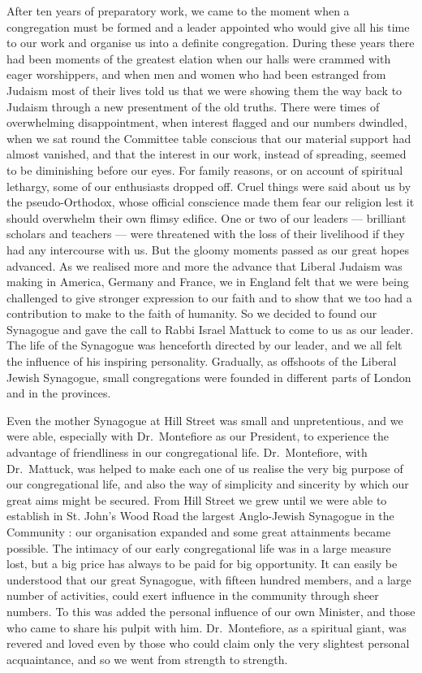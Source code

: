 After ten years of preparatory work, we came to the
moment when a congregation must be formed and a
leader appointed who would give all his time to our
work and organise us into a definite congregation.
During these years there had been moments of the
greatest elation when our halls were crammed with eager
worshippers, and when men and women who had been
estranged from Judaism most of their lives told us that
we were showing them the way back to Judaism through
a new presentment of the old truths. There were times
of overwhelming disappointment, when interest flagged
and our numbers dwindled, when we sat round the
Committee table conscious that our material support had
almost vanished, and that the interest in our work,
instead of spreading, seemed to be diminishing before
our eyes. For family reasons, or on account of spiritual
lethargy, some of our enthusiasts dropped off. Cruel
things were said about us by the pseudo-Orthodox, whose
official conscience made them fear our religion lest it
should overwhelm their own flimsy edifice. One or two
of our leaders — brilliant scholars and teachers — were
threatened with the loss of their livelihood if they had
any intercourse with us. But the gloomy moments
passed as our great hopes advanced. As we realised more
and more the advance that Liberal Judaism was making
in America, Germany and France, we in England felt
that we were being challenged to give stronger expression
to our faith and to show that we too had a contribution
to make to the faith of humanity. So we decided to found
our Synagogue and gave the call to Rabbi Israel Mattuck
to come to us as our leader. The life of the Synagogue
was henceforth directed by our leader, and we all felt
the influence of his inspiring personality. Gradually, as
offshoots of the Liberal Jewish Synagogue, small congregations
were founded in different parts of London and in
the provinces.

Even the mother Synagogue at Hill Street was small
and unpretentious, and we were able, especially with
Dr.\ Montefiore as our President, to experience the
advantage of friendliness in our congregational life.
Dr.\ Montefiore, with Dr.\ Mattuck, was helped to
make each one of us realise the very big purpose of our
congregational life, and also the way of simplicity and
sincerity by which our great aims might be secured.
From Hill Street we grew until we were able to establish
in St. John’s Wood Road the largest Anglo-Jewish
Synagogue in the Community : our organisation expanded
and some great attainments became possible. The
intimacy of our early congregational life was in a large
measure lost, but a big price has always to be paid for
big opportunity. It can easily be understood that our
great Synagogue, with fifteen hundred members, and a
large number of activities, could exert influence in the
community through sheer numbers. To this was added
the personal influence of our own Minister, and those who
came to share his pulpit with him. Dr.\ Montefiore, as a
spiritual giant, was revered and loved even by those who
could claim only the very slightest personal acquaintance,
and so we went from strength to strength.

